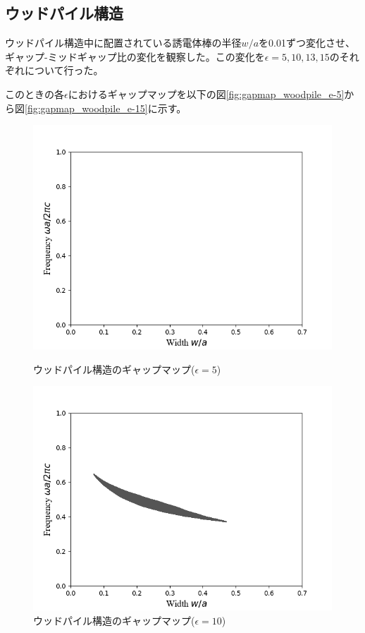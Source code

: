 \documentclass[platex,dvipdfmx]{jsreport}
\numberwithin{equation}{section}
\begin{document}
\clearpage

\subsection{ウッドパイル構造}
ウッドパイル構造中に配置されている誘電体棒の半径$w / a$を0.01ずつ変化させ、ギャップ-ミッドギャップ比の変化を観察した。この変化を$\epsilon = 5, 10, 13, 15$のそれぞれについて行った。

このときの各$\epsilon$におけるギャップマップを以下の図\ref{fig:gapmap_woodpile_e-5}から図\ref{fig:gapmap_woodpile_e-15}に示す。
\begin{figure}[h]
  \begin{minipage}[h]{0.5\linewidth}
    \centering
    \includegraphics[keepaspectratio, scale=0.45]{results/gap_map/woodpile-2_e-5.png}
    \caption{ウッドパイル構造のギャップマップ($\epsilon = 5$)}
    \label{fig:gapmap_woodpile_e-5}
  \end{minipage}
  \begin{minipage}[h]{0.5\linewidth}
    \centering
    \includegraphics[keepaspectratio, scale=0.45]{results/gap_map/woodpile-2_e-10.png}
    \caption{ウッドパイル構造のギャップマップ($\epsilon = 10$)}
    \label{fig:gapmap_woodpile_e-10}
  \end{minipage}
\end{figure}
\end{document}
